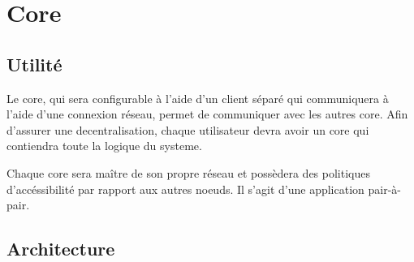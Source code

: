 ﻿\section{Core}
\subsection{Utilité}
Le core, qui sera configurable à l'aide d'un client séparé qui communiquera
à l'aide d'une connexion réseau, permet de communiquer avec les autres core.
Afin d'assurer une decentralisation, chaque utilisateur devra avoir un core qui contiendra toute la logique du systeme.

Chaque core sera maître de son propre réseau et possèdera des politiques d'accéssibilité
par rapport aux autres noeuds. Il s'agit d'une application pair-à-pair.

\subsection{Architecture}
